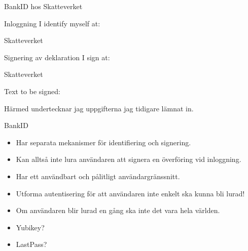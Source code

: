 \begin{frame}{BankID hos Skatteverket}
  \begin{block}{Inloggning}
    I identify myself at:
    
    Skatteverket
  \end{block}
  \begin{block}{Signering av deklaration}
    I sign at:

    Skatteverket

    \vspace{1em}
    Text to be signed:

    Härmed undertecknar jag uppgifterna jag tidigare lämnat in.
  \end{block}
\end{frame}

\begin{frame}{BankID}
  \begin{itemize}
    \item Har separata mekanismer för identifiering och signering.
    \item Kan alltså inte lura användaren att signera en överföring vid 
      inloggning.
    \item Har ett användbart och pålitligt användargränssnitt.
  \end{itemize}
\end{frame}

\begin{frame}
  \begin{itemize}
    \item Utforma autentisering för att användaren inte enkelt ska kunna bli 
      lurad!
    \item Om användaren blir lurad en gång ska inte det vara hela världen.
  \end{itemize}
\end{frame}


\begin{frame}
  \begin{itemize}
    \item Yubikey?
    \item LastPass?
  \end{itemize}
\end{frame}


